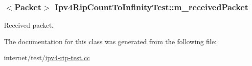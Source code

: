 \subsubsection[{\texorpdfstring{m\+\_\+received\+Packet}{m_receivedPacket}}]{$<${\bf Packet}$>$ Ipv4\+Rip\+Count\+To\+Infinity\+Test\+::m\+\_\+received\+Packet\hspace{0.3cm}{\ttfamily [private]}}\hypertarget{classIpv4RipCountToInfinityTest_ac2a357fe9b26ee36a808472b7cb063a7}{}\label{classIpv4RipCountToInfinityTest_ac2a357fe9b26ee36a808472b7cb063a7}


Received packet. 



The documentation for this class was generated from the following file\+:\begin{DoxyCompactItemize}
\item 
internet/test/\hyperlink{ipv4-rip-test_8cc}{ipv4-\/rip-\/test.\+cc}\end{DoxyCompactItemize}
